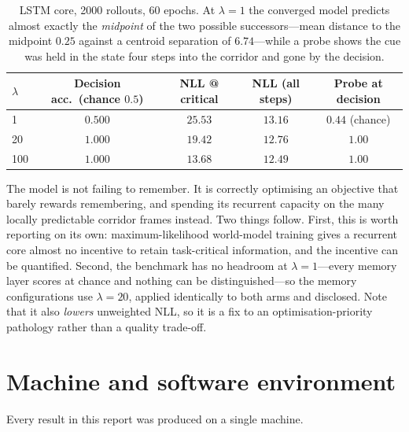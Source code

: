 \documentclass[11pt,a4paper]{article}
\begin{document}
\begin{table}[h]
\centering
\begin{tabular}{lcccc}
\toprule
$\lambda$ & Decision acc.\ (chance $0.5$) & NLL @ critical & NLL (all steps) & Probe at decision \\
\midrule
1   & $0.500$ & $25.53$ & $13.16$ & $0.44$ (chance) \\
20  & $1.000$ & $19.42$ & $12.76$ & $1.00$ \\
100 & $1.000$ & $13.68$ & $12.49$ & $1.00$ \\
\bottomrule
\end{tabular}
\caption{LSTM core, 2000 rollouts, 60 epochs. At $\lambda=1$ the converged model
predicts almost exactly the \emph{midpoint} of the two possible successors---mean
distance to the midpoint $0.25$ against a centroid separation of $6.74$---while a
probe shows the cue was held in the state four steps into the corridor and gone
by the decision.}
\label{tab:lambda}
\end{table}

The model is not failing to remember. It is correctly optimising an objective
that barely rewards remembering, and spending its recurrent capacity on the many
locally predictable corridor frames instead. Two things follow. First, this is
worth reporting on its own: maximum-likelihood world-model training gives a
recurrent core almost no incentive to retain task-critical information, and the
incentive can be quantified. Second, the benchmark has no headroom at
$\lambda=1$---every memory layer scores at chance and nothing can be
distinguished---so the memory configurations use $\lambda=20$, applied
identically to both arms and disclosed. Note that it also \emph{lowers}
unweighted NLL, so it is a fix to an optimisation-priority pathology rather than
a quality trade-off.

\section{Machine and software environment}
\label{sec:env}

Every result in this report was produced on a single machine.
\end{document}

